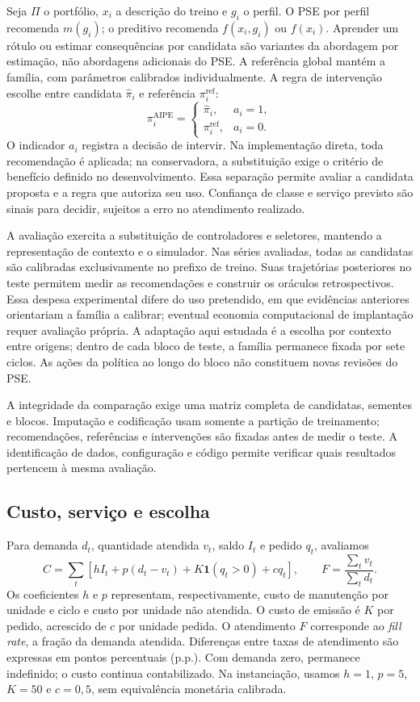 \documentclass[preprint,12pt]{elsarticle}
\begin{document}
Seja $\Pi$ o portfólio, $x_i$ a descrição do treino e $g_i$ o perfil. O PSE por perfil recomenda $m(g_i)$; o preditivo recomenda $f(x_i,g_i)$ ou $f(x_i)$. Aprender um rótulo ou estimar consequências por candidata são variantes da abordagem por estimação, não abordagens adicionais do PSE. A referência global mantém a família, com parâmetros calibrados individualmente. A regra de intervenção escolhe entre candidata $\widehat\pi_i$ e referência $\pi_i^{\mathrm{ref}}$:
\[
 \pi_i^{\mathrm{AIPE}}=
 \begin{cases}\widehat\pi_i,&a_i=1,\\\pi_i^{\mathrm{ref}},&a_i=0.\end{cases}
\]
O indicador $a_i$ registra a decisão de intervir. Na implementação direta, toda recomendação é aplicada; na conservadora, a substituição exige o critério de benefício definido no desenvolvimento. Essa separação permite avaliar a candidata proposta e a regra que autoriza seu uso. Confiança de classe e serviço previsto são sinais para decidir, sujeitos a erro no atendimento realizado.

A avaliação exercita a substituição de controladores e seletores, mantendo a representação de contexto e o simulador. Nas séries avaliadas, todas as candidatas são calibradas exclusivamente no prefixo de treino. Suas trajetórias posteriores no teste permitem medir as recomendações e construir os oráculos retrospectivos. Essa despesa experimental difere do uso pretendido, em que evidências anteriores orientariam a família a calibrar; eventual economia computacional de implantação requer avaliação própria. A adaptação aqui estudada é a escolha por contexto entre origens; dentro de cada bloco de teste, a família permanece fixada por sete ciclos. As ações da política ao longo do bloco não constituem novas revisões do PSE.

A integridade da comparação exige uma matriz completa de candidatas, sementes e blocos. Imputação e codificação usam somente a partição de treinamento; recomendações, referências e intervenções são fixadas antes de medir o teste. A identificação de dados, configuração e código permite verificar quais resultados pertencem à mesma avaliação.

\subsection{Custo, serviço e escolha}
Para demanda $d_t$, quantidade atendida $v_t$, saldo $I_t$ e pedido $q_t$, avaliamos
\begin{equation}
 C=\sum_t[hI_t+p(d_t-v_t)+K\mathbf1(q_t>0)+cq_t],
 \qquad F=\frac{\sum_t v_t}{\sum_t d_t}.
 \label{eq:metrics}
\end{equation}
Os coeficientes $h$ e $p$ representam, respectivamente, custo de manutenção por unidade e ciclo e custo por unidade não atendida. O custo de emissão é $K$ por pedido, acrescido de $c$ por unidade pedida. O atendimento $F$ corresponde ao \textit{fill rate}, a fração da demanda atendida. Diferenças entre taxas de atendimento são expressas em pontos percentuais (p.p.). Com demanda zero, permanece indefinido; o custo continua contabilizado. Na instanciação, usamos $h=1$, $p=5$, $K=50$ e $c=0{,}5$, sem equivalência monetária calibrada.
\end{document}
